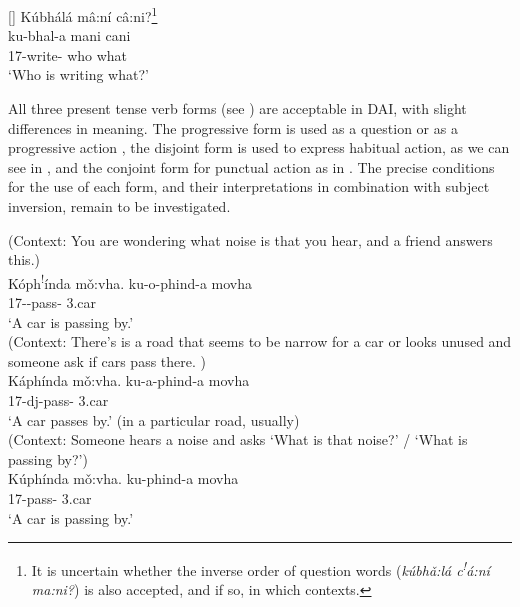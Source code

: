 \documentclass[output=paper]{langscibook}
\begin{document}
\z
\z
\ea
[]{
\label{bkm:Ref120691168}
Kúbhálá mâ:ní câ:ni?\footnote{It is uncertain whether the inverse order of question words (\textit{kúbhǎ:lá c\textsuperscript{!}á:ní ma:ni?}) is also accepted, and if so, in which contexts.}\\
\gll ku-bhal-a  mani  cani\\ 
17\SM{}-write-\FV{}  who  what\\\jambox*{[VSO]}
\glt
‘Who is writing what?’\\
}

\z

All three present tense verb forms (see ) are acceptable in DAI, with slight differences in meaning. The progressive form is used as a question or as a progressive action , the disjoint form is used to express habitual action, as we can see in , and the conjoint form for punctual action as in . The precise conditions for the use of each form, and their interpretations in combination with subject inversion, remain to be investigated.

\ea\label{bkm:Ref136237672}
\ea
\label{bkm:Ref136237672:a}
(Context: You are wondering what noise is that you hear, and a friend answers this.)\\
Kóph\textsuperscript{!}índa mǒ:vha. \jambox*{[progressive]}
\gll
ku-o-phind-a  movha\\
17\SM{}-\PROG{}-pass-\FV{}  3.car\\
\glt
‘A car is passing by.’\\


\ex
\label{bkm:Ref136237672:b}
(Context: There’s is a road that seems to be narrow for a car or looks unused and someone ask if cars pass there. )\\
Káphínda mǒ:vha. \jambox*{[disjoint]}
\gll
ku-a-phind-a  movha\\
17\SM{}-dj-pass-\FV{}  3.car\\
\glt
‘A car passes by.’ (in a particular road, usually)\\


\ex
\label{bkm:Ref136237672:c}
(Context: Someone hears a noise and asks ‘What is that noise?’ / ‘What is passing by?’)\\
Kúphínda mǒ:vha. \jambox*{[conjoint]}
\gll
ku-phind-a  movha\\
17\SM{}-pass-\FV{}  3.car\\
\glt
‘A car is passing by.’\\
\end{document}
